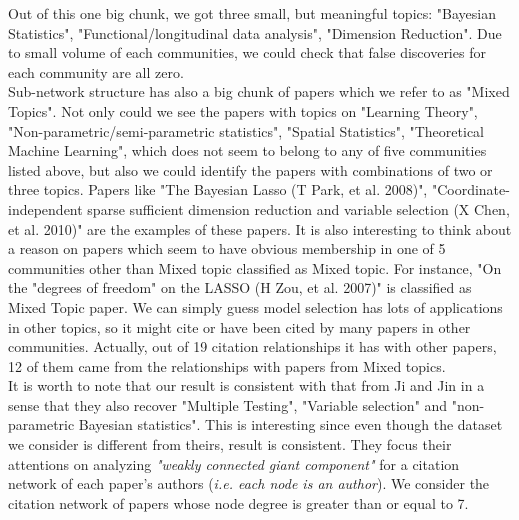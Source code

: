 \documentclass{article}
\begin{document}
\noindent Out of this one big chunk, we got three small, but meaningful topics: "Bayesian Statistics", "Functional/longitudinal data analysis", "Dimension Reduction". Due to small volume of each communities, we could check that false discoveries for each community are all zero.\\

\noindent Sub-network structure has also a big chunk of papers which we refer to as "Mixed Topics". Not only could we see the papers with topics on "Learning Theory", "Non-parametric/semi-parametric statistics", "Spatial Statistics", "Theoretical Machine Learning", which does not seem to belong to any of five communities listed above, but also we could identify the papers with combinations of two or three topics. Papers like "The Bayesian Lasso (T Park, et al. 2008)", "Coordinate-independent sparse sufficient dimension reduction and variable selection (X Chen, et al. 2010)" are the examples of these papers. It is also interesting to think about a reason on papers which seem to have obvious membership in one of 5 communities other than Mixed topic classified as Mixed topic. For instance, "On the "degrees of freedom" on the LASSO (H Zou, et al. 2007)" is classified as Mixed Topic paper. We can simply guess model selection has lots of applications in other topics, so it might cite or have been cited by many papers in other communities. Actually, out of 19 citation relationships it has with other papers, 12 of them came from the relationships with papers from Mixed topics. \\

\noindent It is worth to note that our result is consistent with that from Ji and Jin in a sense that they also recover "Multiple Testing", "Variable selection" and "non-parametric Bayesian statistics". This is interesting since even though the dataset we consider is different from theirs, result is consistent. They focus their attentions on analyzing {\it "weakly connected giant component"} for a citation network of each paper's authors ({\it i.e. each node is an author}). We consider the citation network of papers whose node degree is greater than or equal to 7.\\
\end{document}
